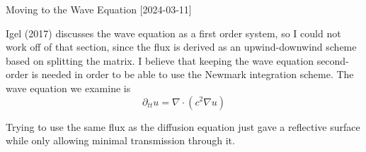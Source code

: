 \documentclass[12pt, letterpaper]{article}
\begin{document}
\begin{section}{Moving to the Wave Equation}
[2024-03-11]

Igel (2017)
discusses the wave equation as a first order system, so I could not work off of that section, since the flux is derived as an upwind-downwind scheme based on splitting the matrix. I believe that keeping the wave equation second-order is needed in order to be able to use the Newmark integration scheme. The wave equation we examine is
$$\partial_{tt}u = \nabla\cdot (c^2 \nabla u)$$

Trying to use the same flux as the diffusion equation just gave a reflective surface while only allowing minimal transmission through it.

\bigskip


\end{section}
\end{document}
